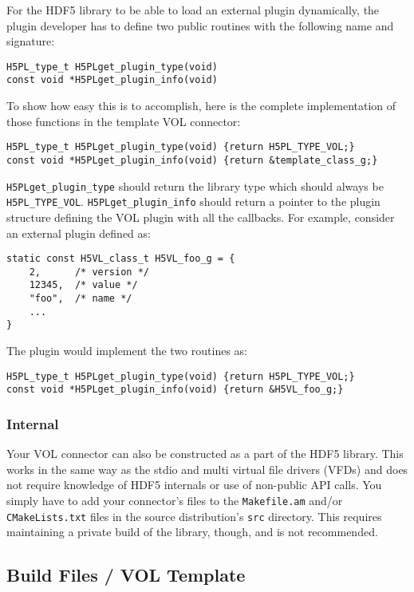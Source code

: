 For the HDF5 library to be able to load an external plugin dynamically, the plugin developer has to define two public routines with the following name and signature:
\begin{lstlisting}
H5PL_type_t H5PLget_plugin_type(void)
const void *H5PLget_plugin_info(void)
\end{lstlisting}

To show how easy this is to accomplish, here is the complete implementation
of those functions in the template VOL connector:

\begin{lstlisting}
H5PL_type_t H5PLget_plugin_type(void) {return H5PL_TYPE_VOL;}
const void *H5PLget_plugin_info(void) {return &template_class_g;}
\end{lstlisting}

{\tt H5PLget\_plugin\_type} should return the library type which should always be {\tt H5PL\_TYPE\_VOL}. {\tt H5PLget\_plugin\_info} should return a pointer to the plugin structure defining the VOL plugin with all the callbacks. For example, consider an external plugin defined as:

\begin{lstlisting}
static const H5VL_class_t H5VL_foo_g = {
    2,      /* version */
    12345,  /* value */
    "foo",  /* name */
    ...
}
\end{lstlisting}

The plugin would implement the two routines as:
\begin{lstlisting}
H5PL_type_t H5PLget_plugin_type(void) {return H5PL_TYPE_VOL;}
const void *H5PLget_plugin_info(void) {return &H5VL_foo_g;}
\end{lstlisting}

\subsubsection*{Internal}

Your VOL connector can also be constructed as a part of the HDF5 library. This
works in the same way as the stdio and multi virtual file drivers (VFDs) and
does not require knowledge of HDF5 internals or use of non-public API calls. You
simply have to add your connector's files to the {\tt Makefile.am} and/or
{\tt CMakeLists.txt} files in the source distribution's {\tt src} directory.
This requires maintaining a private build of the library, though, and is not
recommended.

\subsection{Build Files / VOL Template}

